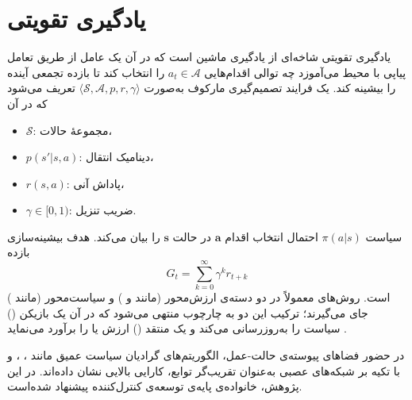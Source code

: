 %

\section{یادگیری تقویتی}\label{sec:rl}

یادگیری تقویتی
 شاخه‌ای از یادگیری ماشین است که در آن یک عامل از طریق تعامل پیاپی با محیط می‌آموزد چه توالی اقدام‌هایی $a_t\in\mathcal{A}$ را انتخاب کند تا بازده تجمعی آینده را بیشینه کند. یک فرایند تصمیم‌گیری مارکوف
  به‌صورت $\langle\mathcal{S},\mathcal{A},p,r,\gamma\rangle$ تعریف می‌شود که در آن
\begin{itemize}
	\item $\mathcal{S}$:
	 مجموعهٔ حالات،
	\item $p(s'|s,a)$:
	 دینامیک انتقال،
	\item $r(s,a)$:
	 پاداش آنی،
	\item $\gamma\in[0,1)$:
	 ضریب تنزیل.
\end{itemize}
\noindent
سیاست
 $\pi(a|s)$ احتمال انتخاب اقدام $\boldsymbol{a}$ در حالت $\boldsymbol{s}$ را بیان می‌کند. هدف بیشینه‌سازی بازده 
 \begin{equation}
 	G_t=\sum_{k=0}^{\infty}\gamma^k r_{t+k}
 \end{equation}
  است. روش‌های  معمولاً در دو دسته‌ی {ارزش‌محور} (مانند  و ) و {سیاست‌محور} (مانند ) جای می‌گیرند؛ ترکیب این دو به چارچوب  منتهی می‌شود که در آن یک بازیکن () سیاست را به‌روزرسانی می‌کند و یک منتقد () ارزش یا  را برآورد می‌نماید
  \cite{SuttonBarto2018}.

در حضور فضاهای پیوسته‌ی حالت-عمل، الگوریتم‌های گرادیان سیاست عمیق مانند ، ،  و  با تکیه بر شبکه‌های عصبی به‌عنوان تقریب‌گر توابع، کارایی بالایی نشان داده‌اند. در این پژوهش، خانواده‌ی  پایه‌ی توسعه‌ی کنترل‌کننده پیشنهاد شده‌است.



